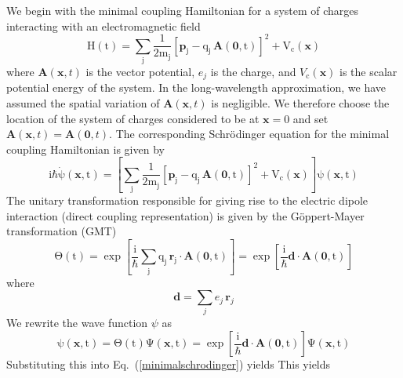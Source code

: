 We begin with the minimal coupling Hamiltonian for a system of charges interacting with an electromagnetic field
\begin{equation}
\mathrm{H(t)=\sum_{j}\frac{1}{2m_j}\left[\mathbf{p}_j-q_j \,\mathbf{A}(\mathbf{0},t)\right]^2+V_{c}(\mathbf{x})}
\label{appendixminimalhamiltonian}
\end{equation}
where $\mathbf{A}(\mathbf{x},t)$ is the vector potential, $e_j$ is the charge, and $V_{\mathrm{c}}(\mathbf{x})$ is the scalar potential energy of the system.  In the long-wavelength approximation, we have assumed the spatial variation of $\mathbf{A}(\mathbf{x},t)$ is negligible.  We therefore choose the location of the system of charges considered to be at $\mathbf{x}=0$ and set $\mathbf{A}(\mathbf{x},t)=\mathbf{A}(\mathbf{0},t)$.  The corresponding Schr\"{o}dinger equation for the minimal coupling Hamiltonian is given by
\begin{equation}
\mathrm{i\hbar \dot{\psi}(\mathbf{x},t)=\left[\sum_{j}\frac{1}{2m_j}\left[\mathbf{p}_j-q_j\, \mathbf{A}(\mathbf{0},t)\right]^2+V_{c}(\mathbf{x})\right]\psi(\mathbf{x},t)}
\label{minimalschrodinger}
\end{equation}
The unitary transformation responsible for giving rise to the electric dipole interaction (direct coupling representation) is given by the G\"{o}ppert-Mayer transformation (GMT)
\begin{equation}
\mathrm{\Theta (t)=\mathrm{\exp{\left[\frac{\mathrm{i}}{\mathrm{\hbar}}\sum_jq_j\,\mathbf{r}_j\cdot \mathbf{A}(\mathbf{0},t) \right]}=\exp{\left[\frac{\mathrm{i}}{\mathrm{\hbar}}\mathbf{d}\cdot \mathbf{A}(\mathbf{0},t) \right]}}}
\label{gmtransformation}
\end{equation}
where
\begin{equation}
\mathbf{d}=\sum_{j} e_j \,\mathbf{r}_j
\end{equation}
 We rewrite the wave function $\psi$ as
\begin{equation}
\mathrm{\psi(\mathbf{x},t)=\Theta(t)\Psi(\mathbf{x},t)=\exp{\left[\frac{\mathrm{i}}{\mathrm{\hbar}}\mathbf{d}\cdot \mathbf{A}(\mathbf{0},t) \right]}\Psi(\mathbf{x},t)}
\end{equation} 
Substituting this into Eq.\ (\ref{minimalschrodinger}) yields
This yields
